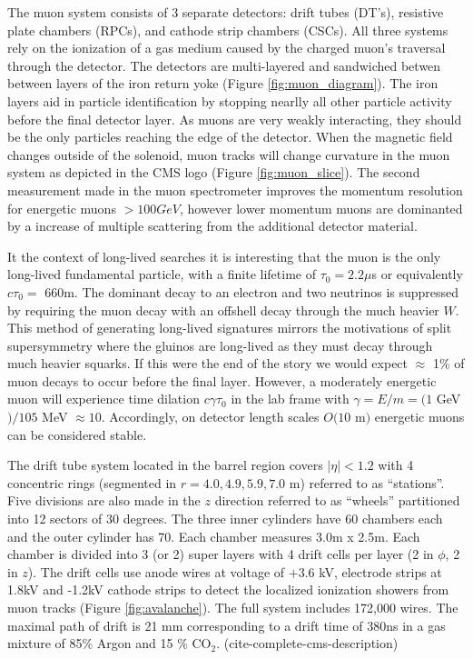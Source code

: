 {The muon system consists of 3 separate detectors: drift tubes (DT's), resistive plate chambers (RPCs), and 
cathode strip chambers (CSCs). All three systems rely on the ionization of a gas medium caused by the charged muon's
traversal through the detector. The detectors are multi-layered and sandwiched betwen between layers of the iron  return
yoke (Figure \ref{fig:muon_diagram}). The iron layers aid in particle identification by stopping nearlly all
 other particle activity before the final detector layer. As  muons are very weakly interacting, they should be the only
particles reaching the edge of the detector. When the magnetic field changes outside of the solenoid, muon tracks
will change curvature in the muon system as depicted in the CMS logo (Figure \ref{fig:muon_slice}). The second measurement
made in the muon spectrometer improves the momentum resolution for energetic muons $>100 GeV$, however lower momentum muons are dominanted by a increase of multiple scattering from the additional detector material. 

It the context of long-lived searches it is interesting that the muon is the only long-lived fundamental particle, with
 a finite lifetime of $\tau_0=2.2 \mu$s or equivalently $c\tau_0 = $ 660m. The dominant decay to an electron and two neutrinos  is suppressed by requiring the muon decay with an  offshell decay through the much heavier $W$. 
This method of generating long-lived signatures mirrors the motivations of
split supersymmetry where the gluinos are long-lived as they must decay through much heavier squarks.
If this were the end of the story we would expect $\approx$ 1\% of muon decays to occur before the final layer.  However, a moderately energetic muon will experience time dilation $c\gamma\tau_0$ in the lab frame with 
$\gamma = E / m = (1$ GeV$)/ 105$ MeV $\approx 10$. Accordingly, on detector length scales $O(10$ m$)$ energetic muons can be considered stable. 

The drift tube system located in the barrel region covers $|\eta| < 1.2$ with 4 concentric rings (segmented in $r=4.0,4.9,5.9,7.0$ m) referred to as ``stations''. Five divisions are also made in 
the $z$ direction referred to as ``wheels'' partitioned into 12 sectors of 30 degrees.  The three inner cylinders have 
60 chambers each and the outer cylinder has 70.   Each chamber measures 3.0m x 2.5m.
 Each chamber is divided into 3 (or 2) super layers with 4 drift cells per layer (2 in $\phi$, 2 in $z$). The drift cells
use  anode wires at voltage of $+3.6$ kV, electrode strips at 1.8kV and -1.2kV cathode strips  to detect the localized ionization showers from muon tracks (Figure \ref{fig:avalanche}). The full system includes 172,000 wires.  The maximal path of drift is 21 mm corresponding 
to a drift time of 380ns in a gas mixture of 85\% Argon and 15 \% CO$_2$. (cite-complete-cms-description)

}
